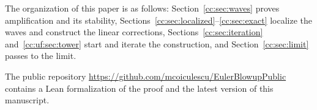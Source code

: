 The organization of this paper is as follows:
Section~\ref{cc:sec:waves} proves amplification and its stability,
Sections~\ref{cc:sec:localized}--\ref{cc:sec:exact} localize the waves
and construct the linear corrections,
Sections~\ref{cc:sec:iteration} and~\ref{cc:uf:sec:tower} start and
iterate the construction, and Section~\ref{cc:sec:limit} passes to the limit.

The public repository
\url{https://github.com/mcoiculescu/EulerBlowupPublic} contains a Lean
formalization of the proof and the latest version of this manuscript.


